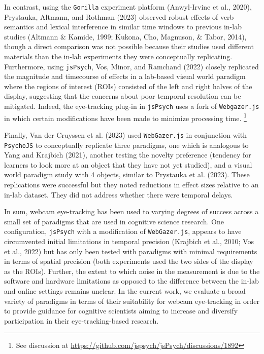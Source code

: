 \documentclass[
  man,floatsintext]{apa6}
\begin{document}
In contrast, using the \texttt{Gorilla} experiment platform (Anwyl-Irvine et al., 2020), Prystauka, Altmann, and Rothman (2023) observed robust effects of verb semantics and lexical interference in similar time windows to previous in-lab studies (Altmann \& Kamide, 1999; Kukona, Cho, Magnuson, \& Tabor, 2014), though a direct comparison was not possible because their studies used different materials than the in-lab experiments they were conceptually replicating. Furthermore, using \texttt{jsPsych}, Vos, Minor, and Ramchand (2022) closely replicated the magnitude and timecourse of effects in a lab-based visual world paradigm where the regions of interest (ROIs) consisted of the left and right halves of the display, suggesting that the concerns about poor temporal resolution can be mitigated. Indeed, the eye-tracking plug-in in \texttt{jsPsych} uses a fork of \texttt{Webgazer.js} in which certain modifications have been made to minimize processing time. \footnote{See discussion at \url{https://github.com/jspsych/jsPsych/discussions/1892}}

Finally, Van der Cruyssen et al. (2023) used \texttt{WebGazer.js} in conjunction with \texttt{PsychoJS} to conceptually replicate three paradigms, one which is analogous to Yang and Krajbich (2021), another testing the novelty preference (tendency for learners to look more at an object that they have not yet studied), and a visual world paradigm study with 4 objects, similar to Prystauka et al. (2023). These replications were successful but they noted reductions in effect sizes relative to an in-lab dataset. They did not address whether there were temporal delays.

In sum, webcam eye-tracking has been used to varying degrees of success across a small set of paradigms that are used in cognitive science research. One configuration, \texttt{jsPsych} with a modification of \texttt{WebGazer.js}, appears to have circumvented initial limitations in temporal precision (Krajbich et al., 2010; Vos et al., 2022) but has only been tested with paradigms with minimal requirements in terms of spatial precision (both experiments used the two sides of the display as the ROIs). Further, the extent to which noise in the measurement is due to the software and hardware limitations as opposed to the difference between the in-lab and online settings remains unclear. In the current work, we evaluate a broad variety of paradigms in terms of their suitability for webcam eye-tracking in order to provide guidance for cognitive scientists aiming to increase and diversify participation in their eye-tracking-based research.
\end{document}
